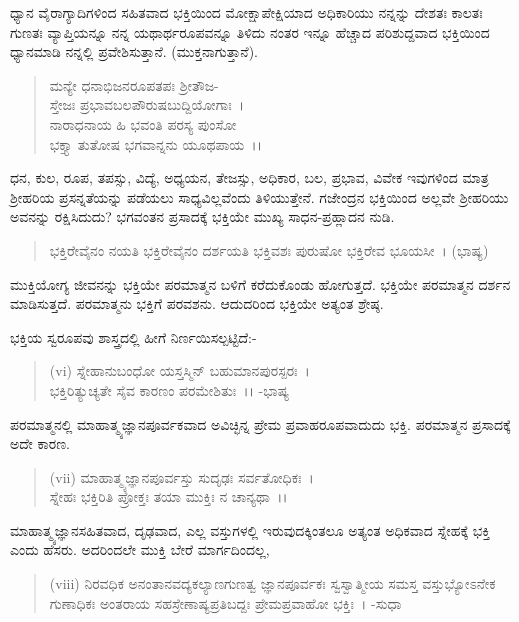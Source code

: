 
ಧ್ಯಾನ ವೈರಾಗ್ಯಾದಿಗಳಿಂದ ಸಹಿತವಾದ ಭಕ್ತಿಯಿಂದ ಮೋಕ್ಷಾಪೇಕ್ಷಿಯಾದ ಅಧಿಕಾರಿಯು ನನ್ನನ್ನು ದೇಶತಃ ಕಾಲತಃ ಗುಣತಃ ವ್ಯಾಪ್ತಿಯನ್ನೂ ನನ್ನ ಯಥಾರ್ಥರೂಪವನ್ನೂ ತಿಳಿದು ನಂತರ ಇನ್ನೂ ಹೆಚ್ಚಾದ ಪರಿಶುದ್ದವಾದ ಭಕ್ತಿಯಿಂದ ಧ್ಯಾನಮಾಡಿ ನನ್ನಲ್ಲಿ ಪ್ರವೇಶಿಸುತ್ತಾನೆ. (ಮುಕ್ತನಾಗುತ್ತಾನೆ).

\begin{verse}
ಮನ್ಯೇ ಧನಾಭಿಜನರೂಪತಪಃ ಶ‍್ರೀತೌಜ-\\ಸ್ತೇಜಃ ಪ್ರಭಾವಬಲಪೌರುಷಬುದ್ದಿಯೋಗಾಃ~।\\ ನಾರಾಧನಾಯ ಹಿ ಭವಂತಿ ಪರಸ್ಯ ಪುಂಸೋ\\ ಭಕ್ತ್ಯಾ ತುತೋಷ ಭಗವಾನ್ನನು ಯೂಥಪಾಯ~।।
\end{verse}


ಧನ, ಕುಲ, ರೂಪ, ತಪಸ್ಸು, ವಿದ್ಯೆ, ಅಧ್ಯಯನ, ತೇಜಸ್ಸು, ಅಧಿಕಾರ, ಬಲ, ಪ್ರಭಾವ, ವಿವೇಕ ಇವುಗಳಿಂದ ಮಾತ್ರ ಶ‍್ರೀಹರಿಯ ಪ್ರಸನ್ನತೆಯನ್ನು ಪಡೆಯಲು ಸಾಧ್ಯವಿಲ್ಲವೆಂದು ತಿಳಿಯುತ್ತೇನೆ. ಗಜೇಂದ್ರನ ಭಕ್ತಿಯಿಂದ ಅಲ್ಲವೇ ಶ‍್ರೀಹರಿಯು ಅವನನ್ನು ರಕ್ಷಿಸಿದುದು? ಭಗವಂತನ ಪ್ರಸಾದಕ್ಕೆ ಭಕ್ತಿಯೇ ಮುಖ್ಯ ಸಾಧನ-ಪ್ರಹ್ಲಾದನ ನುಡಿ.

\begin{verse}
ಭಕ್ತಿರೇವೈನಂ ನಯತಿ ಭಕ್ತಿರೇವೈನಂ ದರ್ಶಯತಿ ಭಕ್ತಿವಶಃ ಪುರುಷೋ ಭಕ್ತಿರೇವ ಭೂಯಸೀ~। (ಭಾಷ್ಯ)
\end{verse}

ಮುಕ್ತಿಯೋಗ್ಯ ಜೀವನನ್ನು ಭಕ್ತಿಯೇ ಪರಮಾತ್ಮನ ಬಳಿಗೆ ಕರೆದುಕೊಂಡು ಹೋಗುತ್ತದೆ. ಭಕ್ತಿಯೇ ಪರಮಾತ್ಮನ ದರ್ಶನ ಮಾಡಿಸುತ್ತದೆ. ಪರಮಾತ್ಮನು ಭಕ್ತಿಗೆ ಪರವಶನು. ಆದುದರಿಂದ ಭಕ್ತಿಯೇ ಅತ್ಯಂತ ಶ್ರೇಷ್ಠ.

ಭಕ್ತಿಯ ಸ್ವರೂಪವು ಶಾಸ್ತ್ರದಲ್ಲಿ ಹೀಗೆ ನಿರ್ಣಯಿಸಲ್ಪಟ್ಟಿದೆ:-

\begin{verse}
(vi) ಸ್ನೇಹಾನುಬಂಧೋ ಯಸ್ತಸ್ಮಿನ್ ಬಹುಮಾನಪುರಸ್ಪರಃ~।\\ ಭಕ್ತಿರಿತ್ಯುಚ್ಯತೇ ಸೈವ ಕಾರಣಂ ಪರಮೇಶಿತುಃ~।। -ಭಾಷ್ಯ
\end{verse}

ಪರಮಾತ್ಮನಲ್ಲಿ ಮಾಹಾತ್ಮ್ಯಜ್ಞಾನಪೂರ್ವಕವಾದ ಅವಿಚ್ಛಿನ್ನ ಪ್ರೇಮ ಪ್ರವಾಹರೂಪವಾದುದು ಭಕ್ತಿ. ಪರಮಾತ್ಮನ ಪ್ರಸಾದಕ್ಕೆ ಅದೇ ಕಾರಣ.

\begin{verse}
(vii) ಮಾಹಾತ್ಮ್ಯಜ್ಞಾನಪೂರ್ವಸ್ತು ಸುದೃಢಃ ಸರ್ವತೋಧಿಕಃ~।\\ ಸ್ನೇಹಃ ಭಕ್ತಿರಿತಿ ಪ್ರೋಕ್ತಃ ತಯಾ ಮುಕ್ತಿಃ ನ ಚಾನ್ಯಥಾ~।।
\end{verse}


ಮಾಹಾತ್ಮ್ಯಜ್ಞಾನಸಹಿತವಾದ, ದೃಢವಾದ, ಎಲ್ಲ ವಸ್ತುಗಳಲ್ಲಿ ಇರುವುದಕ್ಕಿಂತಲೂ ಅತ್ಯಂತ ಅಧಿಕವಾದ ಸ್ನೇಹಕ್ಕೆ ಭಕ್ತಿ ಎಂದು ಹೆಸರು. ಅದರಿಂದಲೇ ಮುಕ್ತಿ ಬೇರೆ ಮಾರ್ಗದಿಂದಲ್ಲ,

\begin{verse}
(viii) ನಿರವಧಿಕ ಅನಂತಾನವದ್ಯಕಲ್ಯಾಣಗುಣತ್ವ ಜ್ಞಾನಪೂರ್ವಕಃ ಸ್ವಸ್ವಾತ್ಮೀಯ ಸಮಸ್ತ ವಸ್ತುಭ್ಯೋಽನೇಕ ಗುಣಾಧಿಕಃ ಅಂತರಾಯ ಸಹಸ್ರೇಣಾಷ್ಯಪ್ರತಿಬದ್ದಃ ಪ್ರೇಮಪ್ರವಾಹೋ ಭಕ್ತಿಃ~। -ಸುಧಾ
\end{verse}

